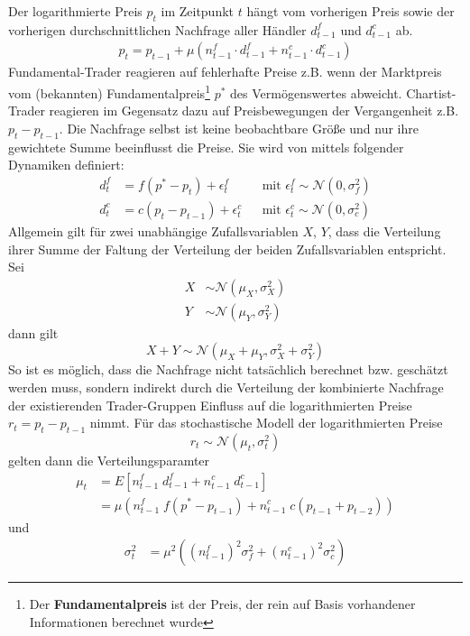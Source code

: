 \documentclass[ngerman]{ttlab-qualify}
\begin{document}
Der logarithmierte Preis $p_t$ im Zeitpunkt $t$ hängt vom vorherigen Preis sowie der vorherigen durchschnittlichen Nachfrage aller Händler $d_{t-1}^f$ und $d_{t-1}^c$ ab. 
\begin{align}
p_t = p_{t-1} + \mu (n_{t-1}^f\cdot d_{t-1}^f + n_{t-1}^c\cdot d_{t-1}^c)
\end{align}
Fundamental-Trader reagieren auf fehlerhafte Preise z.B. wenn der Marktpreis vom (bekannten) Fundamentalpreis\footnote{Der \textbf{Fundamentalpreis} ist der Preis, der rein auf Basis vorhandener Informationen berechnet wurde} $p^*$ des Vermögenswertes abweicht. Chartist-Trader reagieren im Gegensatz dazu auf Preisbewegungen der Vergangenheit z.B. $p_t-p_{t-1}$.
Die Nachfrage selbst ist keine beobachtbare Größe und nur ihre gewichtete Summe beeinflusst die Preise. Sie wird von \parencite{bertschinger:2018,FW:2011} mittels folgender Dynamiken definiert:
\begin{align}
d_t^f &= f(p^*-p_t)+\epsilon_t^f & &\text{mit }\epsilon_t^f\sim \mathcal{N}(0,\sigma^2_f)\nonumber \\
d_t^c &= c(p_t-p_{t-1})+\epsilon_t^c & &\text{mit }\epsilon_t^c\sim \mathcal{N}(0,\sigma^2_c)\nonumber 
\end{align}
Allgemein gilt für zwei unabhängige Zufallsvariablen $X$, $Y$, dass die Verteilung ihrer Summe der Faltung der Verteilung der beiden Zufallsvariablen entspricht.\\
Sei
\begin{align}
X&\sim \mathcal{N}(\mu_X, \sigma_X^2)\nonumber \\
Y&\sim \mathcal{N}(\mu_Y,\sigma_Y^2)\nonumber
\end{align}
dann gilt
\[X+Y\sim\mathcal{N}(\mu_X+\mu_Y,\sigma_X^2+\sigma_Y^2)\]
So ist es möglich, dass die Nachfrage nicht tatsächlich berechnet bzw. geschätzt werden muss, sondern indirekt durch die Verteilung der kombinierte Nachfrage der existierenden Trader-Gruppen Einfluss auf die logarithmierten Preise $r_t = p_t-p_{t-1}$ nimmt.
Für das stochastische Modell der logarithmierten Preise 
\[r_t\sim\mathcal{N}(\mu_t,\sigma_t^2)\]
gelten dann die Verteilungsparamter
\begin{align}
\mu_t&= E[n_{t-1}^f\; d_{t-1}^f + n_{t-1}^c\; d_{t-1}^c]\nonumber\\
&=\mu (n_{t-1}^f\; f(p^*-p_{t-1}) +n_{t-1}^c\; c(p_{t-1}+p_{t-2}))
\end{align}
und
\begin{align}
\label{eq:FW-vol}
\sigma_t^2 &= \mu^2((n_{t-1}^f)^2\sigma_f^2 + (n_{t-1}^c)^2\sigma_c^2)
\end{align}
\end{document}
